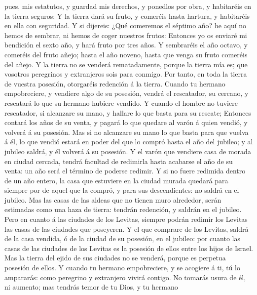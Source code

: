 pues, mis estatutos, y guardad mis derechos, y ponedlos por obra, y
habitaréis en la tierra seguros;  Y la tierra dará su
fruto, y comeréis hasta hartura, y habitaréis en ella con seguridad.
 Y si dijereis: ¿Qué comeremos el séptimo año? he aquí no
hemos de sembrar, ni hemos de coger nuestros frutos: 
Entonces yo os enviaré mi bendición el sexto año, y hará fruto por tres
años.  Y sembraréis el año octavo, y comeréis del fruto
añejo; hasta el año noveno, hasta que venga su fruto comeréis del añejo.
 Y la tierra no se venderá rematadamente, porque la
tierra mía es; que vosotros peregrinos y extranjeros sois para conmigo.
 Por tanto, en toda la tierra de vuestra posesión,
otorgaréis redención á la tierra.  Cuando tu hermano
empobreciere, y vendiere algo de su posesión, vendrá el rescatador, su
cercano, y rescatará lo que su hermano hubiere vendido. 
Y cuando el hombre no tuviere rescatador, si alcanzare su mano, y
hallare lo que basta para su rescate;  Entonces contará
los años de su venta, y pagará lo que quedare al varón á quien vendió, y
volverá á su posesión.  Mas si no alcanzare su mano lo
que basta para que vuelva á él, lo que vendió estará en poder del que lo
compró hasta el año del jubileo; y al jubileo saldrá, y él volverá á su
posesión.  Y el varón que vendiere casa de morada en
ciudad cercada, tendrá facultad de redimirla hasta acabarse el año de su
venta: un año será el término de poderse redimir.  Y si
no fuere redimida dentro de un año entero, la casa que estuviere en la
ciudad murada quedará para siempre por de aquel que la compró, y para
sus descendientes: no saldrá en el jubileo.  Mas las
casas de las aldeas que no tienen muro alrededor, serán estimadas como
una haza de tierra: tendrán redención, y saldrán en el jubileo.
 Pero en cuanto á las ciudades de los Levitas, siempre
podrán redimir los Levitas las casas de las ciudades que poseyeren.
 Y el que comprare de los Levitas, saldrá de la casa
vendida, ó de la ciudad de su posesión, en el jubileo: por cuanto las
casas de las ciudades de los Levitas es la posesión de ellos entre los
hijos de Israel.  Mas la tierra del ejido de sus ciudades
no se venderá, porque es perpetua posesión de ellos.  Y
cuando tu hermano empobreciere, y se acogiere á ti, tú lo ampararás:
como peregrino y extranjero vivirá contigo.  No tomarás
usura de él, ni aumento; mas tendrás temor de tu Dios, y tu hermano

